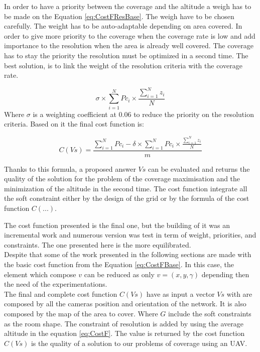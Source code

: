 In order to have a priority  between the coverage and the altitude a weigh has to be made on the Equation \ref{eq:CostFResBase}. The weigh have to be chosen carefully.
The weight has to be auto-adaptable depending on area covered. In order to give more priority to the coverage when the coverage rate is low and add importance to the resolution when the area is already well covered. The coverage has to stay the priority the resolution must be optimized in a second time.
The best solution, is to link the weight of the resolution criteria with the coverage rate.

\begin{equation}\label{eq:CostFResPondere}
  \sigma \times \sum_{i=1}^N {Pc_i} \times \frac{\sum_{i=1}^N z_i}{N}     
\end{equation}
Where $\sigma$ is a weighting coefficient at 0.06 to reduce the priority on the resolution criteria. 
Based on it the final cost function is: 

\begin{equation}\label{eq:CostF}
C(Vs) =  \frac{\sum_{i=1}^N{Pc_i}  - \delta  \times \sum_{i=1}^N {Pc_i} \times \frac{\sum_{i=1}^N z_i}{N}  }{m}   
\end{equation}

Thanks to this formula, a proposed answer $Vs$ can be evaluated and returns the quality of the solution for the problem of the coverage maximisation and the minimization of the altitude in the second time. The cost function integrate all the soft constraint either by the design of the grid or by the formula of the cost function $C(...)$.

The cost function presented is the final one, but the building of it was an incremental work and numerous version was test in term of weight, priorities, and constraints. The one presented here is the more equilibrated.\\ 
Despite that some of the work  presented in the following sections are made with the basic cost function from the Equation \ref{eq:CostFBase}. In this case, the element which compose $v$ can be reduced as only $v=(x,y,\gamma)$ depending then the need of the experimentations.\\

The final and complete cost function $C(Vs)$ have as input a vector $Vs$ with are composed by all the cameras position and orientation of the network. It is also composed by the map of the area to cover. Where $G$ include the soft constraints as the room shape. The constraint of resolution is added by using the average altitude in the equation \ref{eq:CostF}.
The value is returned by the cost function $C(Vs)$ is the quality of a solution to our problems of coverage using an UAV.






